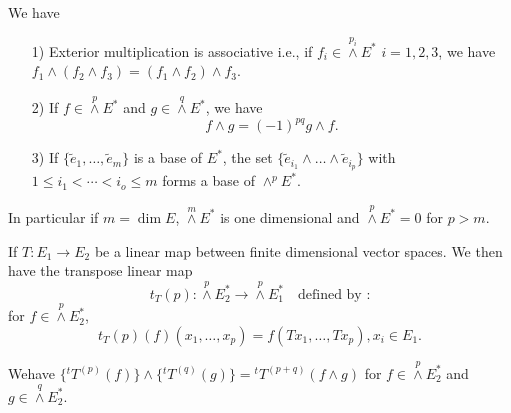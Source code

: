 We have
\begin{prop*}
\begin{itemize}
\item[\rm 1)] Exterior multiplication is associative i.e., if $f_{i}\in {\displaystyle{\mathop{\wedge}\limits^{p_{i}}}}E^{*}$ $i=1,2,3$, we have $f_{1}\wedge(f_{2}\wedge f_{3})=(f_{1}\wedge f_{2})\wedge f_{3}$.

\item[\rm 2)] If $f\in {\displaystyle{\mathop{\wedge}\limits^{p}}}E^{*}$ and $g\in {\displaystyle{\mathop{\wedge}\limits^{q}}}E^{*}$, we have
$$
f\wedge g= (-1)^{pq} g\wedge f.
$$

\item[\rm 3)] If $\{\widetilde{e}_{1},\ldots,\widetilde{e}_{m}\}$ is a base of $E^{*}$, the set $\{\widetilde{e}_{i_{1}}\wedge\ldots\wedge \widetilde{e}_{i_{p}}\}$ with $1\leq i_{1}<\cdots <i_{o}\leq m$ forms a base of ${\displaystyle{\mathop{\wedge}^{p}}}E^{*}$.
\end{itemize}
\end{prop*}

In particular if $m=\dim E$, ${\displaystyle{\mathop{\wedge}\limits^{m}}}E^{*}$ is one dimensional and ${\displaystyle{\mathop{\wedge}\limits^{p}}}E^{*}=0$ for $p>m$.

If $T:E_{1}\to E_{2}$ be a linear map between finite dimensional vector spaces. We then have the transpose linear map
$$
t_{T}(p):{\displaystyle{\mathop{\wedge}\limits^{p}}}E^{*}_{2}\to {\displaystyle{\mathop{\wedge}\limits^{p}}}E^{*}_{1}\quad\text{defined by :}
$$
for $f\in {\displaystyle{\mathop{\wedge}\limits^{p}}}E^{*}_{2}$,
$$
t_{T}(p)(f)(x_{1},\ldots,x_{p})=f(Tx_{1},\ldots,Tx_{p}),x_{i}\in E_{1}.
$$

We\pageoriginale have $\{{}^{t}T^{(p)}(f)\}\wedge \{{}^{t}T^{(q)}(g)\}={}^{t}T^{(p+q)}(f\wedge g)$ for $f\in {\displaystyle{\mathop{\wedge}\limits^{p}}} E^{*}_{2}$ and $g\in {\displaystyle{\mathop{\wedge}\limits^{q}}}E^{*}_{2}$.






